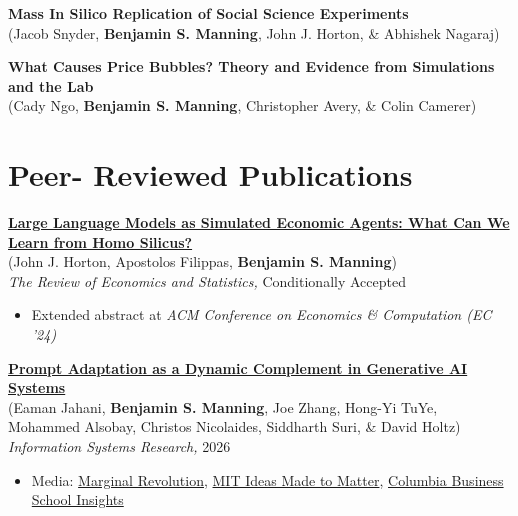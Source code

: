 \documentclass[margin,line,pifont,palatino,courier, 9pt]{res}
\begin{document}
\begin{resume}
{\bf Mass In Silico Replication of Social Science Experiments}\\
(Jacob Snyder\footnotemark[\value{footnote}], \textbf{Benjamin S. Manning}\footnotemark[\value{footnote}], John J. Horton\footnotemark[\value{footnote}], \& Abhishek Nagaraj\footnotemark[\value{footnote}])

{\bf What Causes Price Bubbles? Theory and Evidence from Simulations and the Lab}\\
(Cady Ngo\footnotemark[\value{footnote}], \textbf{Benjamin S. Manning}\footnotemark[\value{footnote}], Christopher Avery\footnotemark[\value{footnote}], \& Colin Camerer\footnotemark[\value{footnote}])

\section{\sc Peer- Reviewed Publications}

\href{https://benjaminmanning.com/files/homo_silicus.pdf}{\bf Large Language Models as Simulated Economic Agents: What Can We Learn from Homo Silicus?}\\
(John J. Horton\footnotemark[\value{footnote}], Apostolos Filippas\footnotemark[\value{footnote}], \textbf{Benjamin S. Manning}\footnotemark[\value{footnote}])\\
\textit{The Review of Economics and Statistics,} Conditionally Accepted
\vspace{0.25cm}
\begin{itemize}
\item Extended abstract at \textit{ACM Conference on Economics \& Computation (EC '24)}
\end{itemize}

\href{https://pubsonline.informs.org/doi/full/10.1287/isre.2025.2029}{\bf Prompt Adaptation as a Dynamic Complement in Generative AI Systems}\\
(Eaman Jahani\footnotemark[\value{footnote}], \textbf{Benjamin S. Manning}, Joe Zhang, Hong-Yi TuYe, Mohammed Alsobay, Christos Nicolaides, Siddharth Suri, \& David Holtz)\\
\textit{Information Systems Research,} 2026
\vspace{0.25cm}
\begin{itemize}
\item Media: \href{https://marginalrevolution.com/marginalrevolution/2025/08/monday-assorted-links-522.html}{Marginal Revolution}, \href{https://mitsloan.mit.edu/ideas-made-to-matter/study-generative-ai-results-depend-user-prompts-much-models}{MIT Ideas Made to Matter}, \href{https://business.columbia.edu/insights/better-ai-doesnt-always-mean-better-outcomes}{Columbia Business School Insights}
\end{itemize}


\end{resume}
\end{document}
